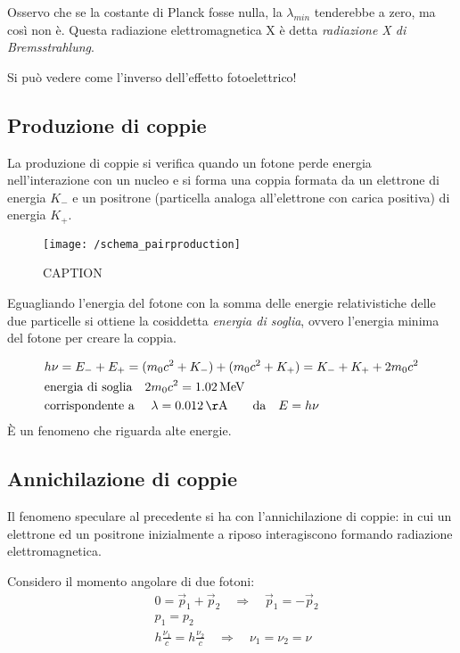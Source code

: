 Osservo che se la costante di Planck fosse nulla, la $\lambda_{min}$ tenderebbe a zero, ma così non è.
Questa radiazione elettromagnetica X è detta \textit{radiazione X di Bremsstrahlung}.

Si può vedere come l'inverso dell'effetto fotoelettrico!


\subsection{Produzione di coppie}

La produzione di coppie si verifica quando un fotone perde energia nell'interazione con un nucleo e si forma una coppia formata da un elettrone di energia $K_-$ e un positrone (particella analoga all'elettrone con carica positiva) di energia $K_+$.

\begin{figure}[h]
\centering
\texttt{[image: /schema\_pairproduction]}
\caption{CAPTION}
\end{figure}

Eguagliando l'energia del fotone con la somma delle energie relativistiche delle due particelle si ottiene la cosiddetta \textit{energia di soglia}, ovvero l'energia minima del fotone per creare la coppia.

\begin{equation}
\begin{split}
& h\nu = E_- + E_+ = (m_0 c^2 + K_-) + (m_0 c^2 + K_+) = K_- + K_+ + 2m_0 c^2 \\
&\mbox{energia di soglia} \quad 2m_0c^2 = \SI{1.02}{MeV} \\
&\mbox{corrispondente a } \quad \lambda = \SI{0.012}{\AA} \quad \quad \mbox{da} \quad E = h\nu
\end{split}
\end{equation}
È un fenomeno che riguarda alte energie.

\subsection{Annichilazione di coppie}
Il fenomeno speculare al precedente si ha con l'annichilazione di coppie: in cui un elettrone ed un positrone inizialmente a riposo interagiscono formando radiazione elettromagnetica.

Considero il momento angolare di due fotoni:
\begin{equation}
\begin{split}
& 0 = \vec p_1 + \vec p_2 \quad \Rightarrow \quad \vec p_1 = - \vec p_2 \\
& p_1 = p_2 \\
& h \frac{ \nu_1}{c } = h \frac{ \nu_2}{c } \quad \Rightarrow \quad \nu_1 = \nu_2 = \nu
\end{split}
\end{equation}

